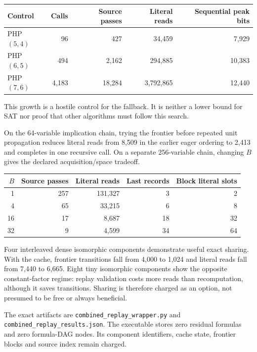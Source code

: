 \documentclass[11pt]{article}
\begin{document}
\begin{center}
\begin{tabular}{lrrrr}
\toprule
Control & Calls & Source passes & Literal reads & Sequential peak bits\\
\midrule
PHP$(5,4)$ & 96 & 427 & 34,459 & 7,929\\
PHP$(6,5)$ & 494 & 2,162 & 294,885 & 10,383\\
PHP$(7,6)$ & 4,183 & 18,284 & 3,792,865 & 12,440\\
\bottomrule
\end{tabular}
\end{center}
This growth is a hostile control for the fallback.  It is neither a lower
bound for SAT nor proof that other algorithms must follow this search.

On the 64-variable implication chain, trying the frontier before repeated unit
propagation reduces literal reads from 8,509 in the earlier eager ordering to
2,413 and completes in one recursive call.  On a separate 256-variable chain,
changing $B$ gives the declared acquisition/space tradeoff.

\begin{center}
\begin{tabular}{rrrrr}
\toprule
$B$ & Source passes & Literal reads & Last records & Block literal slots\\
\midrule
1 & 257 & 131,327 & 3 & 2\\
4 & 65 & 33,215 & 6 & 8\\
16 & 17 & 8,687 & 18 & 32\\
32 & 9 & 4,599 & 34 & 64\\
\bottomrule
\end{tabular}
\end{center}

Four interleaved dense isomorphic components demonstrate useful exact sharing.
With the cache, frontier transitions fall from 4,000 to 1,024 and literal reads
fall from 7,440 to 6,665.  Eight tiny isomorphic components show the opposite
constant-factor regime: replay validation costs more reads than recomputation,
although it saves transitions.  Sharing is therefore charged as an option,
not presumed to be free or always beneficial.

The exact artifacts are
\texttt{combined\_replay\_wrapper.py} and
\texttt{combined\_replay\_results.json}.  The executable stores zero residual
formulas and zero formula-DAG nodes.  Its component identifiers, cache state,
frontier blocks and source index remain charged.
\end{document}
